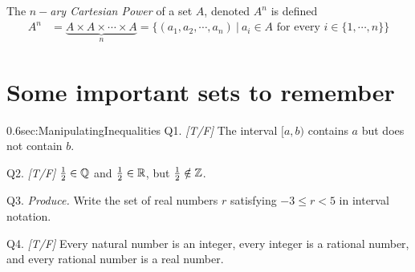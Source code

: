 \begin{definition}
    The \textit{$n-$ary Cartesian Power} of a set $A$, denoted $A^n$ is defined
    \begin{align}
        A^n &= \underbrace{A\times A \times \cdots \times A}_{n} = \{(a_1, a_2, \cdots, a_n) \ | \ a_i \in A \text{ for every } i \in \{1, \cdots, n\}\} \nonumber
    \end{align}
\end{definition}
\newpage
\noindent\section{Some important sets to remember}
\label{sec:ImportantSets}

\begin{selfcheckbox}{0.6}{sec:ManipulatingInequalities}
  \hypertarget{q:ch0:impsets}{}
  Q1. \textit{[T/F]} The interval $[a, b)$ contains $a$ but does not contain $b$.\par\smallskip
  Q2. \textit{[T/F]} $\tfrac{1}{2} \in {\mathbb{Q}}$ and $\tfrac{1}{2} \in {\mathbb{R}}$, but $\tfrac{1}{2} \notin {\mathbb{Z}}$.\par\smallskip
  Q3. \textit{Produce.} Write the set of real numbers $r$ satisfying $-3 \leq r < 5$ in interval notation.\par\smallskip
  Q4. \textit{[T/F]} Every natural number is an integer, every integer is a rational number, and every rational number is a real number.
  \par\medskip\hfill{}
\end{selfcheckbox}


